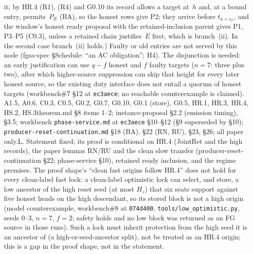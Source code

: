 \documentclass{article}
\newcommand{\cF}{c_F}
\begin{document}
{it; by HR.4 (R1), (R4) and G0.10 its record allows a target at~$h$ and, at a
bound entry, permits~$P_E$ (BA), so the honest rows give P2; they arrive before
$t_{u+\cF}$, and the window's honest ready proposal with the retained-inclusion
parent gives P1, P3--P5 (C0.3), unless a retained chain justifies~$E$ first,
which is branch~(ii).  In the second case branch~(ii) holds.)  Faulty or old entries are not
served by this node (fgsa-spec \S Schedule: ``an AC obligation''; H4).  The disjunction is
needed: an early justification can use $q-f$ honest and $f$ faulty targets
($n=7$: three plus two), after which higher-source suppression can skip that
height for every later honest source, so the existing duty interface does not
entail a quorum of honest targets (workbench\#7 \S12 at \texttt{ec3aece}; no reachable
counterexample is claimed).}
{A1.5, A0.6, C0.3, C0.5, G0.2, G0.7, G0.10, G0.1 (store), G0.5, HR.1,
HR.3, HR.4, HS.2, HS.3}{theorem.md \S8 items 1--2; instance-proposal
\S2.2 (emission timing), \S3.5; workbench \texttt{phase-service.md} at
\texttt{ec3aece} \S10--\S12 (\S9 superseded by \S10);
\texttt{producer-reset-continuation.md} \S18 (BA), \S22 (RN, RU), \S23, \S26;
all paper only.}{L.  Statement fixed; its proof is conditional on HR.4
(JointRet and the high records), the paper lemmas RN/RU and the clean slow
transfer (producer-reset-continuation \S22; phase-service \S10), retained
ready inclusion, and the regime premises.  The proof shape's ``clean fast
origins follow HR.4'' does not hold for every clean-label fast lock: a
clean-label optimistic lock can select, and store, a low ancestor of the high
reset seed (at most $H_z$) that six seats support against five honest heads on
the high descendant, so its stored block is not a high origin (model
counterexample, workbench\#8 at \texttt{074d400},
\texttt{tools/low\_optimistic.py}, seeds 0--3, $n=7$, $f=2$; safety holds and
no low block was returned as an FG source in those runs).  Such a lock must
inherit protection from the high seed it is an ancestor of (a high-or-seed-ancestor
split), not be treated as an HR.4 origin; this is a gap in the proof shape, not
in the statement.}
\end{document}
